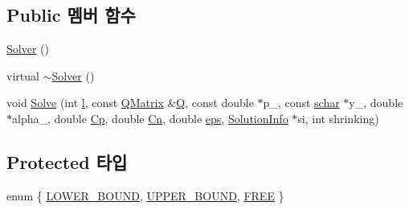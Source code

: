 \subsection*{Public 멤버 함수}
\begin{DoxyCompactItemize}
\item 
\hyperlink{class_solver_a9dfe7ae9ce617e8a6398be34284c907a}{Solver} ()
\item 
virtual \hyperlink{class_solver_a14f7014dd6e46e3990dea30b5ad3c087}{$\sim$\+Solver} ()
\item 
void \hyperlink{class_solver_aa3ab5672a26826f9dc1ac9145620a823}{Solve} (int \hyperlink{class_solver_a88832d45b6de977b1cbb2afd4c0e494c}{l}, const \hyperlink{class_q_matrix}{Q\+Matrix} \&\hyperlink{class_solver_a2d3461718f0570bdc47f5dfb31d61e0a}{Q}, const double $\ast$p\+\_\+, const \hyperlink{svm_8cpp_a0fd9ce9d735064461bebfe6037026093}{schar} $\ast$y\+\_\+, double $\ast$alpha\+\_\+, double \hyperlink{class_solver_a2e45dbea8be469bf8247e14768549dd5}{Cp}, double \hyperlink{class_solver_a38d741d194839fb445f982dd78e0b97b}{Cn}, double \hyperlink{class_solver_a718333cc2c1d40abf9c292a788cba1e5}{eps}, \hyperlink{struct_solver_1_1_solution_info}{Solution\+Info} $\ast$si, int shrinking)
\end{DoxyCompactItemize}
\subsection*{Protected 타입}
\begin{DoxyCompactItemize}
\item 
enum \{ \hyperlink{class_solver_a86c1a7637bc803ef8496c7dbf7f00b03aeb78558e05ec0672378c3e801e866560}{L\+O\+W\+E\+R\+\_\+\+B\+O\+U\+N\+D}, 
\hyperlink{class_solver_a86c1a7637bc803ef8496c7dbf7f00b03aef825a32b2471cdb0724cfa9c1f051fd}{U\+P\+P\+E\+R\+\_\+\+B\+O\+U\+N\+D}, 
\hyperlink{class_solver_a86c1a7637bc803ef8496c7dbf7f00b03a904f6af2170b6f900fbd3d46cd055c76}{F\+R\+E\+E}
 \}
\end{DoxyCompactItemize}
